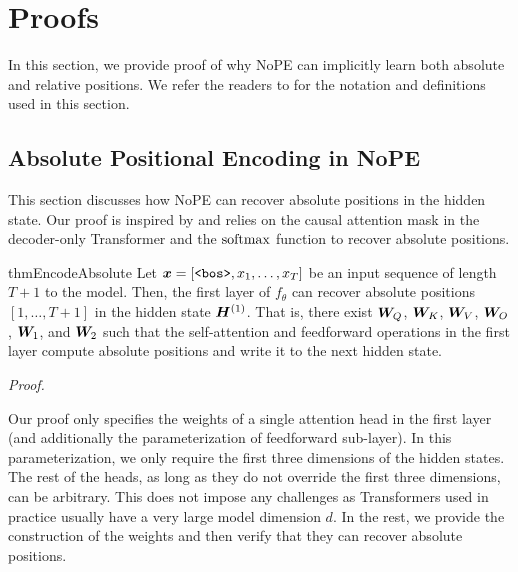 \documentclass{article}
\begin{document}
\section{Proofs}
In this section, we provide proof of why NoPE can implicitly learn both absolute and relative positions.
We refer the readers to  for the notation and definitions used in this section.
\subsection{Absolute Positional Encoding in NoPE}
\label{sec:sketch-proof-no-pe}
This section discusses how NoPE can recover absolute positions in the hidden state. Our proof is inspired by \citet{weiss2021thinking,lindner2023tracr} and relies on the causal attention mask in the decoder-only Transformer and the $\mathrm{softmax}$ function to recover absolute positions.


\begin{mdframed}[style=MyFrame2]
  \begin{restatable*}{thm}{EncodeAbsolute}
    Let ${\bm{x}} = \left[\texttt{<bos>}, x_1, \ldots, x_T\right]$ be an input sequence of length $T+1$ to the model.
    Then, the first layer of $f_\theta$ can recover absolute positions $[1, \ldots, T+1]$ in the hidden state ${\bm{H}}^{(1)}$.
    That is, there exist ${\bm{W}}_Q$, ${\bm{W}}_K$, ${\bm{W}}_V$, ${\bm{W}}_O$, ${\bm{W}}_1$, and ${\bm{W}}_2$ such that the self-attention and feedforward operations in the first layer compute absolute positions and write it to the next hidden state.
  \end{restatable*}
\end{mdframed}
\textit{Proof.}

Our proof only specifies the weights of a single attention head in the first layer (and additionally the parameterization of feedforward sub-layer).
In this parameterization, we only require the first three dimensions of the hidden states.
The rest of the heads, as long as they do not override the first three dimensions, can be arbitrary. This does not impose any challenges as Transformers used in practice usually have a very large model dimension $d$.
In the rest, we provide the construction of the weights and then verify that they can recover absolute positions.
\end{document}
